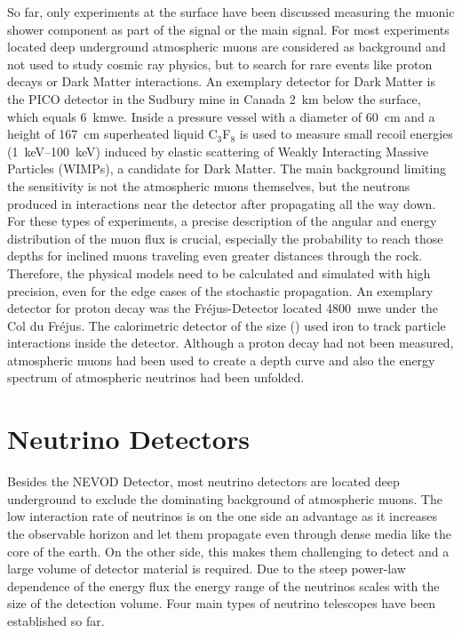 So far, only experiments at the surface have been discussed measuring the muonic shower component as part of the signal or the main signal.
For most experiments located deep underground atmospheric muons are considered as background and not used to study cosmic ray physics, but to search for rare events like proton decays or Dark Matter interactions.
An exemplary detector for Dark Matter is the PICO detector \cite{Amole19PICO} in the Sudbury mine in Canada \SI{2}{km} below the surface, which equals \SI{6}{kmwe}.
Inside a pressure vessel with a diameter of \SI{60}{cm} and a height of \SI{167}{cm} superheated liquid C$_3$F$_8$ is used to measure small recoil energies (\SIrange{1}{100}{keV}) induced by elastic scattering of Weakly Interacting Massive Particles (WIMPs), a candidate for Dark Matter.
The main background limiting the sensitivity is not the atmospheric muons themselves, but the neutrons produced in interactions near the detector after propagating all the way down.
For these types of experiments, a precise description of the angular and energy distribution of the muon flux is crucial, especially the probability to reach those depths for inclined muons traveling even greater distances through the rock.
Therefore, the physical models need to be calculated and simulated with high precision, even for the edge cases of the stochastic propagation.
An exemplary detector for proton decay was the Fr\'{e}jus-Detector \cite{Frejus95nu} located \SI{4800}{mwe} under the Col du Fr\'{e}jus.
The calorimetric detector of the size () used iron to track particle interactions inside the detector.
Although a proton decay had not been measured, atmospheric muons had been used to create a depth curve and also the energy spectrum of atmospheric neutrinos had been unfolded.

%
%
%
%

\section{Neutrino Detectors}

Besides the NEVOD Detector, most neutrino detectors are located deep underground to exclude the dominating background of atmospheric muons.
The low interaction rate of neutrinos is on the one side an advantage as it increases the observable horizon and let them propagate even through dense media like the core of the earth.
On the other side, this makes them challenging to detect and a large volume of detector material is required.
Due to the steep power-law dependence of the energy flux the energy range of the neutrinos scales with the size of the detection volume.
Four main types of neutrino telescopes have been established so far.

